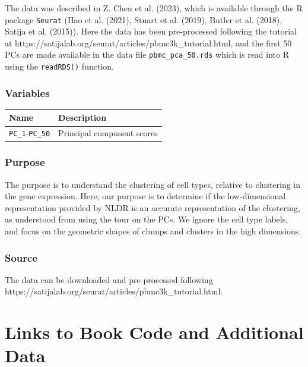 \documentclass[
  letterpaper,
]{krantz}
\begin{document}
The data was described in Z. Chen et al. (2023), which is available
through the R package \texttt{Seurat} (Hao et al. (2021), Stuart et al.
(2019), Butler et al. (2018), Satija et al. (2015)). Here the data has
been pre-processed following the tutorial at
https://satijalab.org/seurat/articles/pbmc3k\_tutorial.html, and the
first 50 PCs are made available in the data file
\texttt{pbmc\_pca\_50.rds} which is read into R using the
\texttt{readRDS()} function.

\subsection*{Variables}\label{variables-12}

\begin{longtable}[]{@{}ll@{}}
\toprule\noalign{}
Name & Description \\
\midrule\noalign{}
\endhead
\bottomrule\noalign{}
\endlastfoot
\texttt{PC\_1}-\texttt{PC\_50} & Principal component scores \\
\end{longtable}

\subsection*{Purpose}\label{purpose-12}

The purpose is to understand the clustering of cell types, relative to
clustering in the gene expression. Here, our purpose is to determine if
the low-dimensional representation provided by NLDR is an accurate
representation of the clustering, as understood from using the tour on
the PCs. We ignore the cell type labels, and focus on the geometric
shapes of clumps and clusters in the high dimensions.

\subsection*{Source}\label{source-12}

The data can be downloaded and pre-processed following
https://satijalab.org/seurat/articles/pbmc3k\_tutorial.html.

\chapter{Links to Book Code and Additional Data}\label{book-data}
\end{document}
